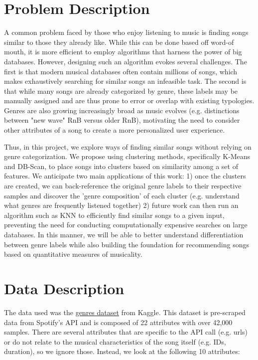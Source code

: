 \documentclass[conference]{IEEEtran}
\begin{document}
\section{Problem Description}
A common problem faced by those who enjoy listening to music is finding songs similar to those they already like. While this can be done based off word-of mouth, it is more efficient to employ algorithms that harness the power of big databases. However, designing such an algorithm evokes several challenges. The first is that modern musical databases often contain millions of songs, which makes exhaustively searching for similar songs an infeasible task. The second is that while many songs are already categorized by genre, these labels may be manually assigned and are thus prone to error or overlap with existing typologies. Genres are also growing increasingly broad as music evolves (e.g. distinctions between "new wave" RnB versus older RnB), motivating the need to consider other attributes of a song to create a more personalized user experience.

Thus, in this project, we explore ways of finding similar songs without relying on genre categorization. We propose using clustering methods, specifically K-Means and DB-Scan, to place songs into clusters based on similarity among a set of features. We anticipate two main applications of this work: 1) once the clusters are created, we can back-reference the original genre labels to their respective samples and discover the 'genre composition' of each cluster (e.g. understand what genres are frequently listened together) 2) future work can then run an algorithm such as KNN to efficiently find similar songs to a given input, preventing the need for conducting computationally expensive searches on large databases. In this manner, we will be able to better understand differentiation between genre labels while also building the foundation for recommending songs based on quantitative measures of musicality.   

\section{Data Description}

The data used was the \href{https://www.kaggle.com/datasets/mrmorj/dataset-of-songs-in-spotify?resource=download} {genres dataset} from Kaggle.  This dataset is pre-scraped data from Spotify's API and is composed of 22 attributes with over 42,000 samples. There are several attributes that are specific to the API call (e.g. urls) or do not relate to the musical characteristics of the song itself (e.g. IDs, duration), so we ignore those. Instead, we look at the following 10 attributes:
\end{document}

